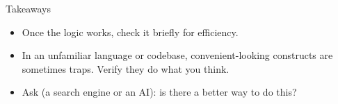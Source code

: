 \documentclass[aspectratio=169]{beamer}
\begin{document}
\begin{frame}{Takeaways}
  \begin{itemize}
    \item Once the logic works, check it briefly for efficiency.
    \item In an unfamiliar language or codebase, convenient-looking constructs are sometimes
      traps. Verify they do what you think.
    \item Ask (a search engine or an AI): is there a better way to do this?
  \end{itemize}
\end{frame}
\end{document}
